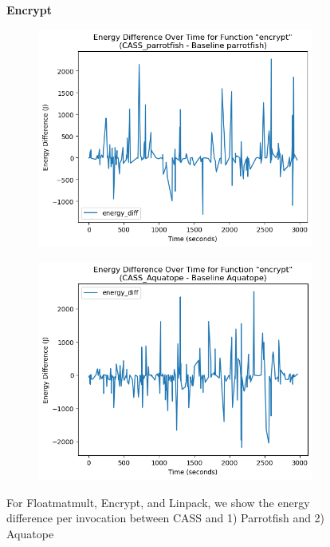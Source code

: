 \documentclass[times, 10pt,twocolumn]{article}
\begin{document}
\begin{figure}[ht]
   \textbf{Encrypt}\par\medskip
   \begin{subfigure}[b]{0.4\textwidth}
      \includegraphics[width=\textwidth]{imgs/final_experiment_plots/energy_comparison/parrotfish/encrypt.png}
     \caption{}
     \label{fig:encrypt_energy_diff_parrotfish}
   \end{subfigure}
   \hfill
   \begin{subfigure}[b]{0.4\textwidth}
      \includegraphics[width=\textwidth]{imgs/final_experiment_plots/energy_comparison/aquatope/encrypt.png}
     \caption{}
     \label{fig:encrypt_energy_diff_aquatope}
   \end{subfigure}
   
   \caption{For Floatmatmult, Encrypt, and Linpack, we show the energy difference per invocation between CASS and 1) Parrotfish and 2) Aquatope}
   \label{fig:end_to_end_per_invocation_}
 \end{figure}
\end{document}
